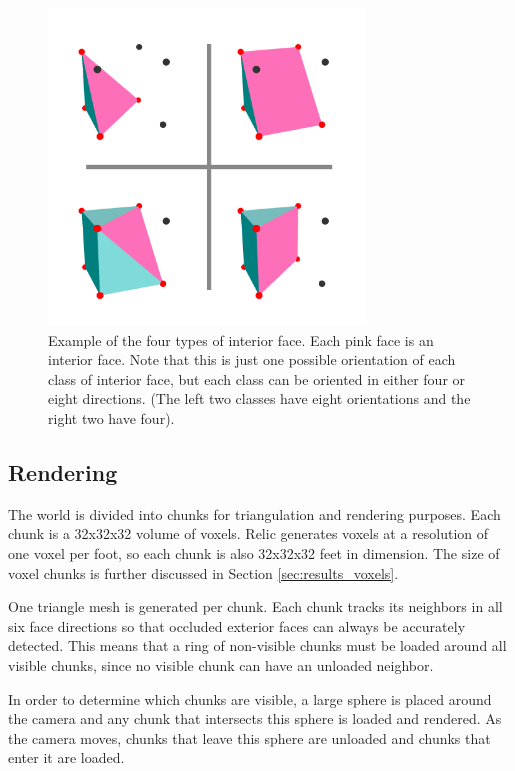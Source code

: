 \begin{figure}
	\centering
		\includegraphics[width=0.75\textwidth]{figures/interiorfaces2.png}
	\caption{
		Example of the four types of interior face.
		Each pink face is an interior face.
		Note that this is just one possible orientation of each class of interior face, but each class can be oriented in either four or eight directions.
		(The left two classes have eight orientations and the right two have four).
	}
	\label{fig:interiorfaces2}
\end{figure}

\subsection{Rendering} \label{sec:voxel_rendering}

The world is divided into chunks for triangulation and rendering purposes.
Each chunk is a 32x32x32 volume of voxels.
Relic generates voxels at a resolution of one voxel per foot, so each chunk is also 32x32x32 feet in dimension.
The size of voxel chunks is further discussed in Section \ref{sec:results_voxels}.

One triangle mesh is generated per chunk.
Each chunk tracks its neighbors in all six face directions so that occluded exterior faces can always be accurately detected.
This means that a ring of non-visible chunks must be loaded around all visible chunks, since no visible chunk can have an unloaded neighbor.

In order to determine which chunks are visible, a large sphere is placed around the camera and any chunk that intersects this sphere is loaded and rendered.
As the camera moves, chunks that leave this sphere are unloaded and chunks that enter it are loaded.

